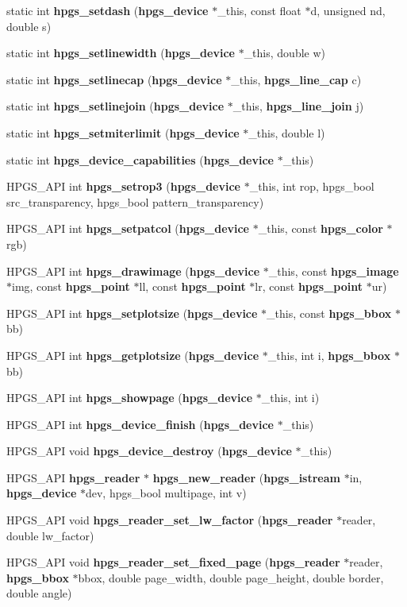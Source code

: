 \begin{DoxyCompactItemize}
static int {\bf hpgs\_\-setdash} ({\bf hpgs\_\-device} $\ast$\_\-this, const float $\ast$d, unsigned nd, double s)
\item 
static int {\bf hpgs\_\-setlinewidth} ({\bf hpgs\_\-device} $\ast$\_\-this, double w)
\item 
static int {\bf hpgs\_\-setlinecap} ({\bf hpgs\_\-device} $\ast$\_\-this, {\bf hpgs\_\-line\_\-cap} c)
\item 
static int {\bf hpgs\_\-setlinejoin} ({\bf hpgs\_\-device} $\ast$\_\-this, {\bf hpgs\_\-line\_\-join} j)
\item 
static int {\bf hpgs\_\-setmiterlimit} ({\bf hpgs\_\-device} $\ast$\_\-this, double l)
\item 
static int {\bf hpgs\_\-device\_\-capabilities} ({\bf hpgs\_\-device} $\ast$\_\-this)
\item 
HPGS\_\-API int {\bf hpgs\_\-setrop3} ({\bf hpgs\_\-device} $\ast$\_\-this, int rop, hpgs\_\-bool src\_\-transparency, hpgs\_\-bool pattern\_\-transparency)
\item 
HPGS\_\-API int {\bf hpgs\_\-setpatcol} ({\bf hpgs\_\-device} $\ast$\_\-this, const {\bf hpgs\_\-color} $\ast$rgb)
\item 
HPGS\_\-API int {\bf hpgs\_\-drawimage} ({\bf hpgs\_\-device} $\ast$\_\-this, const {\bf hpgs\_\-image} $\ast$img, const {\bf hpgs\_\-point} $\ast$ll, const {\bf hpgs\_\-point} $\ast$lr, const {\bf hpgs\_\-point} $\ast$ur)
\item 
HPGS\_\-API int {\bf hpgs\_\-setplotsize} ({\bf hpgs\_\-device} $\ast$\_\-this, const {\bf hpgs\_\-bbox} $\ast$bb)
\item 
HPGS\_\-API int {\bf hpgs\_\-getplotsize} ({\bf hpgs\_\-device} $\ast$\_\-this, int i, {\bf hpgs\_\-bbox} $\ast$bb)
\item 
HPGS\_\-API int {\bf hpgs\_\-showpage} ({\bf hpgs\_\-device} $\ast$\_\-this, int i)
\item 
HPGS\_\-API int {\bf hpgs\_\-device\_\-finish} ({\bf hpgs\_\-device} $\ast$\_\-this)
\item 
HPGS\_\-API void {\bf hpgs\_\-device\_\-destroy} ({\bf hpgs\_\-device} $\ast$\_\-this)
\item 
HPGS\_\-API {\bf hpgs\_\-reader} $\ast$ {\bf hpgs\_\-new\_\-reader} ({\bf hpgs\_\-istream} $\ast$in, {\bf hpgs\_\-device} $\ast$dev, hpgs\_\-bool multipage, int v)
\item 
HPGS\_\-API void {\bf hpgs\_\-reader\_\-set\_\-lw\_\-factor} ({\bf hpgs\_\-reader} $\ast$reader, double lw\_\-factor)
\item 
HPGS\_\-API void {\bf hpgs\_\-reader\_\-set\_\-fixed\_\-page} ({\bf hpgs\_\-reader} $\ast$reader, {\bf hpgs\_\-bbox} $\ast$bbox, double page\_\-width, double page\_\-height, double border, double angle)

\end{DoxyCompactItemize}
